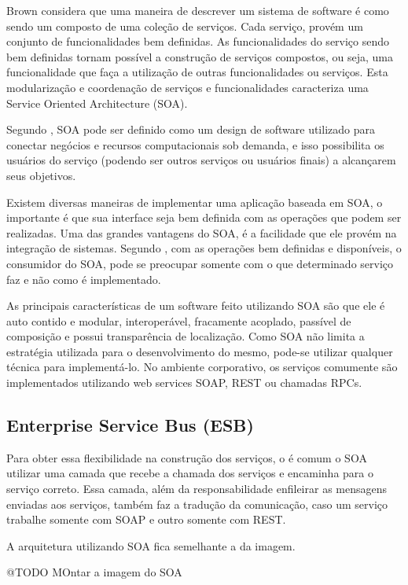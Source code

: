 Brown considera que uma maneira de descrever um sistema de software é como sendo um composto de 
uma coleção de serviços. Cada serviço, provém um conjunto de funcionalidades bem definidas. 
As funcionalidades do serviço sendo bem definidas tornam possível a construção de serviços 
compostos, ou seja, uma funcionalidade que faça a utilização de outras funcionalidades ou serviços. 
Esta modularização e coordenação de serviços e funcionalidades caracteriza uma 
Service Oriented Architecture (SOA).

Segundo \cite{valipour}, SOA pode ser definido como um design de software utilizado para 
conectar negócios e recursos computacionais sob demanda, e isso possibilita os usuários 
do serviço (podendo ser outros serviços ou usuários finais) a alcançarem seus objetivos. 

Existem diversas maneiras de implementar uma aplicação baseada em SOA, o importante é que 
sua interface seja bem definida com as operações que podem ser realizadas. 
Uma das grandes vantagens do SOA, é a facilidade que ele provém na integração de sistemas. 
Segundo \cite{valipour}, com as operações bem definidas e disponíveis, o consumidor do SOA, 
pode se preocupar somente com o que determinado serviço faz e não como é implementado.

As principais características de um software feito utilizando SOA são que ele é auto contido e 
modular, interoperável, fracamente acoplado, passível de composição e possui transparência de localização. 
Como SOA não limita a estratégia utilizada para o desenvolvimento do mesmo, pode-se utilizar qualquer 
técnica para implementá-lo. No ambiente corporativo, os serviços comumente são implementados 
utilizando web services SOAP, REST ou chamadas RPCs.

\subsection{Enterprise Service Bus (ESB)}

Para obter essa flexibilidade na construção dos serviços, o é comum o SOA utilizar
uma camada que recebe a chamada dos serviços e encaminha para o serviço correto.
Essa camada, além da responsabilidade enfileirar as mensagens enviadas aos serviços,
também faz a tradução da comunicação, caso um serviço trabalhe somente com SOAP e outro somente
com REST.

A arquitetura utilizando SOA fica semelhante a da imagem.

@TODO MOntar a imagem do SOA

